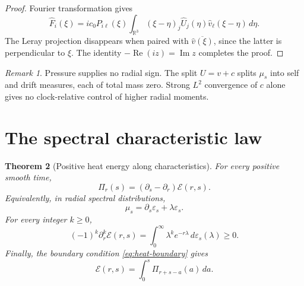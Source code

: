 \documentclass[11pt]{article}
\newtheorem{theorem}{Theorem}
\theoremstyle{remark}
\newtheorem{remark}[theorem]{Remark}
\newcommand{\R}{\mathbb R}
\begin{document}
\begin{proof}
Fourier transformation gives
\[
 \widehat F_i(\xi)
 =
 ic_0P_{i\ell}(\xi)
 \int_{\R^3}
 (\xi-\eta)_j\widehat U_j(\eta)
 \widehat v_\ell(\xi-\eta)\,d\eta.
\]
The Leray projection disappears when paired with
\(\overline{\widehat v(\xi)}\), since the latter is perpendicular to
\(\xi\).  The identity
\(-\operatorname{Re}(iz)=\operatorname{Im}z\) completes the proof.
\end{proof}

\begin{remark}
Pressure supplies no radial sign.  The split \(U=v+c\) splits \(\mu_s\)
into self and drift measures, each of total mass zero.  Strong \(L^2\)
convergence of \(c\) alone gives no clock-relative control of higher
radial moments.
\end{remark}

\section{The spectral characteristic law}

\begin{theorem}[Positive heat energy along characteristics]
\label{thm:characteristic}
For every positive smooth time,
\begin{equation}
\label{eq:characteristic}
 \boxed{
 \Pi_r(s)=(\partial_s-\partial_r)\mathcal E(r,s).
 }
\end{equation}
Equivalently, in radial spectral distributions,
\begin{equation}
\label{eq:measure-evolution}
 \boxed{
 \mu_s=\partial_s\varepsilon_s+\lambda\varepsilon_s.
 }
\end{equation}
For every integer \(k\ge0\),
\begin{equation}
\label{eq:CM}
 \boxed{
 (-1)^k\partial_r^k\mathcal E(r,s)
 =
 \int_0^\infty
 \lambda^ke^{-r\lambda}\,d\varepsilon_s(\lambda)
 \ge0.
 }
\end{equation}
Finally, the boundary condition \eqref{eq:heat-boundary} gives
\begin{equation}
\label{eq:reconstruction}
 \boxed{
 \mathcal E(r,s)
 =
 \int_0^s\Pi_{r+s-a}(a)\,da.
 }
\end{equation}
\end{theorem}
\end{document}
